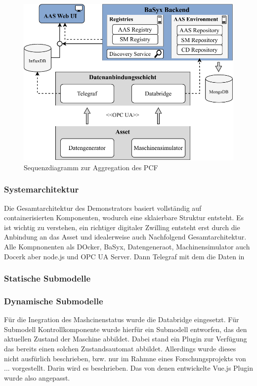 \begin{figure}[htbp]
    \centering
        \includegraphics[width=1\textwidth]{Bilder/Ergebnisse/DynamischeDaten/Architektur.pdf}
    
    \caption{Sequenzdiagramm zur Aggregation des PCF}
    \label{fig:SequenzdiagrammPCF}
\end{figure}




\subsubsection{Systemarchitektur}
Die Gesamtarchitektur des Demonstrators basiert vollständig auf containerisierten Komponenten, wodurch eine sklaierbare Struktur entsteht.
Es ist wichtig zu verstehen, ein richtiger digitaler Zwilling entsteht erst durch die Anbindung an das Asset und idealerweise auch
Nachfolgend Gesamtarchitektur.
Alle Kompnonenten als DOcker, BaSyx, Datengeneraot, Machinensimulator auch Docerk aber node.js und OPC UA Server.
Dann Telegraf mit dem die Daten in 
\subsubsection{Statische Submodelle}

\subsubsection{Dynamische Submodelle}

Für die Inegration des Mashcinenstatus wurde die Databridge eingesetzt.
Für Submodell Kontrollkomponente wurde hierfür ein Submodell entworfen, das den aktuellen Zustand der Maschine abbildet.
Dabei stand ein Plugin zur Verfügung das bereits einen solchen Zustandsautomat abbildet.
Allerdings wurde dieses nicht ausfürlich beschrieben, bzw. nur im Rahmne eines Forschungsprojekts von ... vorgestellt.
Darin wird es beschrieben.
Das von denen entwickelte Vue.js Plugin wurde also angepasst.

